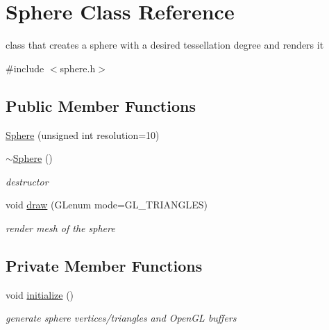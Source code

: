 \hypertarget{classSphere}{}\section{Sphere Class Reference}
\label{classSphere}


class that creates a sphere with a desired tessellation degree and renders it  




{\ttfamily \#include $<$sphere.\+h$>$}

\subsection*{Public Member Functions}
\begin{DoxyCompactItemize}
\item 
\hyperlink{classSphere_aaa85311066ef64357254d1603d03a0d7}{Sphere} (unsigned int resolution=10)
\item 
\hyperlink{classSphere_a569c071e50a3e11f678630ee1a17737e}{$\sim$\+Sphere} ()
\begin{DoxyCompactList}\small\item\em destructor \end{DoxyCompactList}\item 
void \hyperlink{classSphere_a5138903e523dc99982dfe0ef124758b9}{draw} (G\+Lenum mode=G\+L\+\_\+\+T\+R\+I\+A\+N\+G\+L\+ES)
\begin{DoxyCompactList}\small\item\em render mesh of the sphere \end{DoxyCompactList}\end{DoxyCompactItemize}
\subsection*{Private Member Functions}
\begin{DoxyCompactItemize}
\item 
void \hyperlink{classSphere_a331081d7eabc043356e6d9ade848464f}{initialize} ()
\begin{DoxyCompactList}\small\item\em generate sphere vertices/triangles and Open\+GL buffers \end{DoxyCompactList}\end{DoxyCompactItemize}
